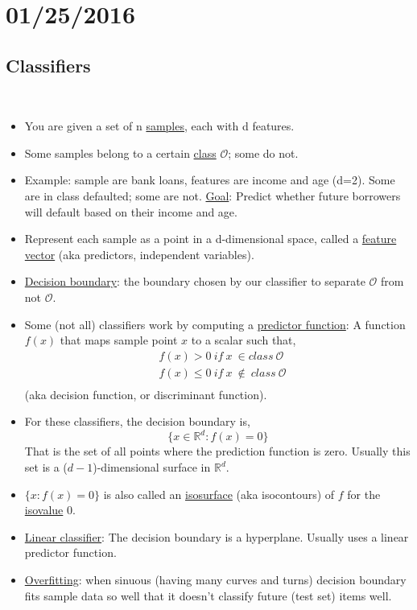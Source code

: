\documentclass[10pt]{article}
\begin{document}
\section*{01/25/2016}
\subsection*{Classifiers}
		\ 
		\begin{itemize}
			\item You are given a set of n \underline{samples}, each with d features.

			\item Some samples belong to a certain \underline{class} $\mathcal{O}$; some do not.

			\item Example: sample are bank loans, features are income and age (d=2). Some are in class defaulted; some are not. \underline{Goal}: Predict whether future borrowers will default based on their income and age.

			\item Represent each sample as a point in a d-dimensional space, called a \underline{feature vector} (aka predictors, independent variables).

			\item \underline{Decision boundary}: the boundary chosen by our classifier to separate $\mathcal{O}$ from not $\mathcal{O}$.

			\item Some (not all) classifiers work by computing a \underline{predictor function}: A function $f(x)$ that maps sample point $x$ to a scalar such that,
				\begin{align*}
					& f(x) > 0 \ if \ x \ \in class \ \mathcal{O} \\
					& f(x) \leq 0 \ if \ x \ \notin \ class \ \mathcal{O}\\
				\end{align*}
				(aka decision function, or discriminant function).
				
			\item For these classifiers, the decision boundary is, 
				$$ \{x \in \mathbb{R}^{d}: f(x) = 0 \} $$
				That is the set of all points where the prediction function is zero. Usually this set is a ($d-1$)-dimensional surface in $\mathbb{R}^{d}$.

			\item $\{ x: f(x) = 0 \}$ is also called an \underline{isosurface} (aka isocontours) of $f$ for the \underline{isovalue} 0.

			\item \underline{Linear classifier}: The decision boundary is a hyperplane. Usually uses a linear predictor function.

			\item \underline{Overfitting}: when sinuous (having many curves and turns) decision boundary fits sample data so well that it doesn't classify future (test set) items well.
		\end{itemize}
		
\end{document}
